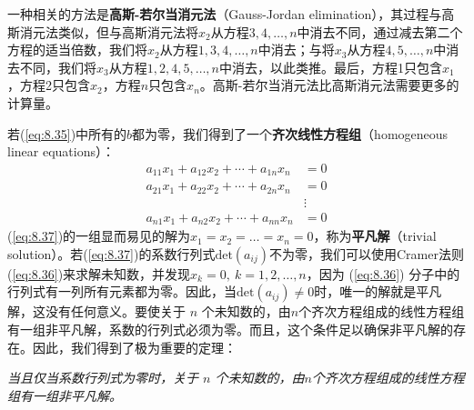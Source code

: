     一种相关的方法是\textbf{高斯-若尔当消元法}（Gauss-Jordan elimination），其过程与高斯消元法类似，但与高斯消元法将$x_2$从方程$3,4,\ldots,n$中消去不同，通过减去第二个方程的适当倍数，我们将$x_2$从方程$1,3,4,\ldots,n$中消去；与将$x_3$从方程$4,5,\ldots,n$中消去不同，我们将$x_3$从方程$1,2,4,5,\ldots,n$中消去，以此类推。最后，方程1只包含$x_1$，方程2只包含$x_2$，方程$n$只包含$x_n$。高斯-若尔当消元法比高斯消元法需要更多的计算量。

    若(\ref{eq:8.35})中所有的$b$都为零，我们得到了一个\textbf{齐次线性方程组}（homogeneous linear equations）：
    \begin{equation}
        \begin{aligned}
            a_{11}x_1 + a_{12}x_2 + \cdots + a_{1n}x_n &= 0 \\
            a_{21}x_1 + a_{22}x_2 + \cdots + a_{2n}x_n &= 0 \\
            &\vdots \\
            a_{n1}x_1 + a_{n2}x_2 + \cdots + a_{nn}x_n &= 0
        \end{aligned}
        \label{eq:8.37}
    \end{equation}
    (\ref{eq:8.37})的一组显而易见的解为$x_1=x_2 = \ldots = x_n=0$，称为\textbf{平凡解}（trivial solution）。若(\ref{eq:8.37})的系数行列式$\mathrm{det}\left(a_{ij}\right)$不为零，我们可以使用Cramer法则(\ref{eq:8.36})来求解未知数，并发现$x_k=0, \: k=1,2,\ldots,n$，因为 (\ref{eq:8.36}) 分子中的行列式有一列所有元素都为零。因此，当$\mathrm{det}\left(a_{ij}\right) \neq 0$时，唯一的解就是平凡解，这没有任何意义。要使关于 $n$ 个未知数的，由$n$个齐次方程组成的线性方程组有一组非平凡解，系数的行列式必须为零。而且，这个条件足以确保非平凡解的存在。因此，我们得到了极为重要的定理：
    \begin{center}
        \parbox{0.8\textwidth}{
            \textit{当且仅当系数行列式为零时，关于 $n$ 个未知数的，由$n$个齐次方程组成的线性方程组有一组非平凡解。}
        }
    \end{center}

